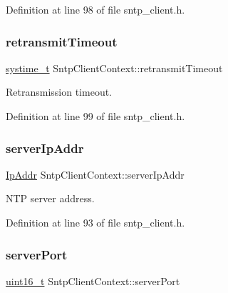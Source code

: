 Definition at line 98 of file sntp\+\_\+client.\+h.

\mbox{\label{structSntpClientContext_a09a8ebb9934b44dfbcca76edab7ceb76}} 
\subsubsection{\texorpdfstring{retransmit\+Timeout}{retransmitTimeout}}
{\footnotesize\ttfamily \hyperlink{compiler__port_8h_ae3e32a98d431a02106616da3071832dd}{systime\+\_\+t} Sntp\+Client\+Context\+::retransmit\+Timeout}



Retransmission timeout. 



Definition at line 99 of file sntp\+\_\+client.\+h.

\mbox{\label{structSntpClientContext_a28000ab694ab2426a9cba5958e77cd2e}} 
\subsubsection{\texorpdfstring{server\+Ip\+Addr}{serverIpAddr}}
{\footnotesize\ttfamily \hyperlink{structIpAddr}{Ip\+Addr} Sntp\+Client\+Context\+::server\+Ip\+Addr}



N\+TP server address. 



Definition at line 93 of file sntp\+\_\+client.\+h.

\mbox{\label{structSntpClientContext_aea4ed19ae27784311580a393fe350705}} 
\subsubsection{\texorpdfstring{server\+Port}{serverPort}}
{\footnotesize\ttfamily \hyperlink{stdint_8h_a273cf69d639a59973b6019625df33e30}{uint16\+\_\+t} Sntp\+Client\+Context\+::server\+Port}



